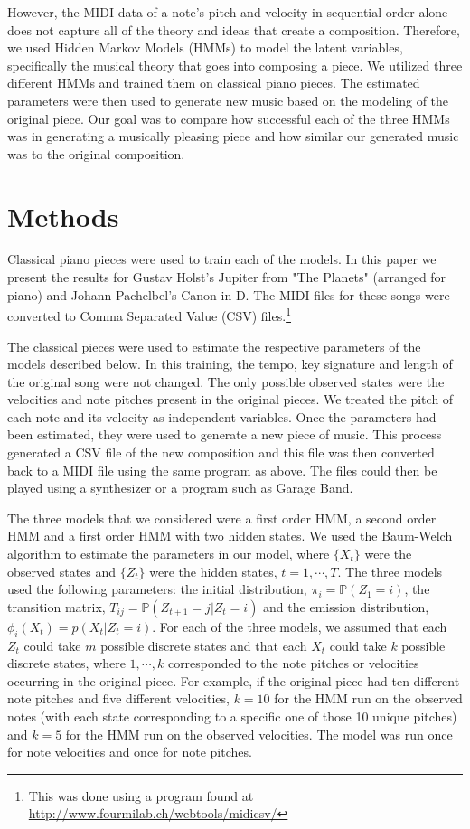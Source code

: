 \documentclass{article} %
\begin{document}
However, the MIDI data of a note's pitch and velocity in sequential order alone does not capture all of the theory and ideas that create a composition. Therefore, we used Hidden Markov Models (HMMs) to model the latent variables, specifically the musical theory that goes into composing a piece. We utilized three different HMMs and trained them on classical piano pieces. The estimated parameters were then used to generate new music based on the modeling of the original piece.  Our goal was to compare how successful each of the three HMMs was in generating a musically pleasing piece and how similar our generated music was to the original composition.

\section{Methods}

Classical piano pieces were used to train each of the models. In this paper we present the results for Gustav Holst's Jupiter from "The Planets" (arranged for piano) and Johann Pachelbel's Canon in D. The MIDI files for these songs were converted to Comma Separated Value (CSV) files.\footnote{This was done using a program found at \url{http://www.fourmilab.ch/webtools/midicsv/}} 

The classical pieces were used to estimate the respective parameters of the models described below. In this training, the tempo, key signature and length of the original song were not changed. The only possible observed states were the velocities and note pitches present in the original pieces. We treated the pitch of each note and its velocity as independent variables.  Once the parameters had been estimated, they were used to generate a new piece of music. This process generated a CSV file of the new composition and this file was then converted back to a MIDI file using the same program as above. The files could then be played using a synthesizer or a program such as Garage Band.

The three models that we considered were a first order HMM, a second order HMM and a first order HMM with two hidden states.  We used the Baum-Welch algorithm  to estimate the parameters in our model, where $\{X_t\}$ were the observed states and $\{Z_t\}$ were the hidden states, $t = 1, \cdots, T$.  The three models used the following parameters: the initial distribution, $\pi_i = \mathbb{P}(Z_1 = i)$, the transition matrix, $T_{ij} = \mathbb{P}(Z_{t+1} = j | Z_t = i)$ and the emission distribution, $\phi_i (X_t) = p(X_t | Z_t = i)$. For each of the three models, we assumed that each $Z_t$ could take $m$ possible discrete states and that each $X_t$ could take $k$  possible discrete states, where $1, \cdots, k$ corresponded to the note pitches or velocities occurring in the original piece. For example, if the original piece had ten different note pitches and five different velocities, $k=10$ for the HMM run on the observed notes (with each state corresponding to a specific one of those 10 unique pitches) and $k=5$ for the HMM run on the observed velocities. The model was run once for note velocities and once for note pitches. 
\end{document}
